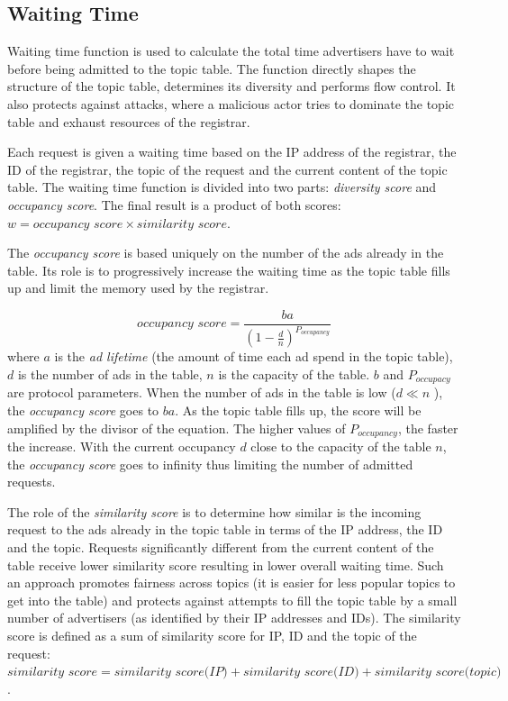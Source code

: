\subsection{Waiting Time}
Waiting time function is used to calculate the total time advertisers have to wait before being admitted to the topic table. The function directly shapes the structure of the topic table, determines its diversity and performs flow control. It also protects against attacks, where a malicious actor tries to dominate the topic table and exhaust resources of the registrar. 

Each request is given a waiting time based on the IP address of the registrar, the ID of the registrar, the topic of the request and the current content of the topic table. The waiting time function is divided into two parts: \emph{diversity score} and \emph{occupancy score}. The final result is a product of both scores: $w =  \textit{occupancy score} \times \textit{similarity score} $. 

The \emph{occupancy score} is based uniquely on the number of the ads already in the table. Its role is to progressively increase the waiting time as the topic table fills up and limit the memory used by the registrar.

\begin{equation}
    \textit{occupancy score} = \frac{ba}{(1-\frac{d}{n})^{P_{occupancy}}}
\end{equation}
where $a$ is the \emph{ad lifetime} (the amount of time each ad spend in the topic table), $d$ is the number of ads in the table, $n$ is the capacity of the table. $b$ and $P_{occupacy}$ are protocol parameters. When the number of ads in the table is low ($d \ll n$ ), the \emph{occupancy score} goes to $ba$. As the topic table fills up, the score will be amplified by the divisor of the equation. The higher values of $P_{occupancy}$, the faster the increase. With the current occupancy $d$ close to the capacity of the table $n$, the \emph{occupancy score} goes to infinity thus limiting the number of admitted requests. 

The role of the \emph{similarity score} is to determine how similar is the incoming request to the ads already in the topic table in terms of the IP address, the ID and the topic. Requests significantly different from the current content of the table receive lower similarity score resulting in lower overall waiting time. Such an approach promotes fairness across topics (it is easier for less popular topics to get into the table) and protects against attempts to fill the topic table by a small number of advertisers (as identified by their IP addresses and IDs). The similarity score is defined as a sum of similarity score for IP, ID and the topic of the request: $\textit{similarity score} = \textit{similarity score(IP)} + \textit{similarity score(ID)} + \textit{similarity score(topic)}$. 

